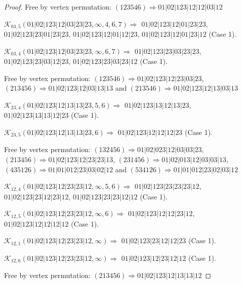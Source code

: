 \documentclass[12pt]{article}
\theoremstyle{plain}
\theoremstyle{definition}
\theoremstyle{remark}
\newcommand{\fancy}[1]{\mathcal{#1}}
\def\K{\fancy{K}}
\begin{document}
\begin{proof}
	
	
	Free by vertex permutation: $(1 2 3 5 4 6)\Rightarrow 01|02|123|12|12|03|12$
	
	
	
	\bigskip
	
	$\K_{03,5}(01|02|123|12|03|23|23,\infty,4, 6, 7)\Rightarrow $ $01|02|123|12|01|23|23$, $01|02|123|23|01|23|23$, $01|02|123|12|01|12|23$, $01|02|123|12|01|23|12$ (Case 1).
	
	$\K_{03,4}(01|02|123|12|03|23|23,\infty,6, 7)\Rightarrow $ $01|02|123|23|03|23|23$, $01|02|123|23|03|12|23$, $01|02|123|23|03|23|12$ (Case 1).
	
	
	
	Free by vertex permutation: $(1 2 3 5 4 6)\Rightarrow 01|02|123|12|23|03|23$, $(2 1 3 4 5 6)\Rightarrow 01|02|123|12|03|13|13$ and $(2 1 3 5 4 6)\Rightarrow 01|02|123|12|13|03|13$
	
	
	
	\bigskip
	
	$\K_{23,4}(01|02|123|12|13|13|23,5, 6)\Rightarrow $ $01|02|123|13|12|13|23$, $01|02|123|13|13|12|23$ (Case 1).
	
	$\K_{23,5}(01|02|123|12|13|13|23,6)\Rightarrow $ $01|02|123|12|12|12|23$ (Case 1).
	
	
	
	Free by vertex permutation: $(1 3 2 4 5 6)\Rightarrow 01|02|023|12|03|03|23$, $(2 1 3 4 5 6)\Rightarrow 01|02|123|12|23|23|13$, $(2 3 1 4 5 6)\Rightarrow 01|02|013|12|03|03|13$, $(4 3 5 1 2 6)\Rightarrow 01|01|012|23|03|02|12$ and $(5 3 4 1 2 6)\Rightarrow 01|01|012|23|02|03|12$
	
	
	
	\bigskip
	
	$\K_{12,4}(01|02|123|12|23|23|12,\infty,5, 6)\Rightarrow $ $01|02|123|23|23|23|12$, $01|02|123|23|12|23|12$, $01|02|123|23|23|12|12$ (Case 1).
	
	$\K_{12,5}(01|02|123|12|23|23|12,\infty,6)\Rightarrow $ $01|02|123|12|12|23|12$, $01|02|123|12|12|12|12$ (Case 1).
	
	$\K_{12,1}(01|02|123|12|23|23|12,\infty)\Rightarrow $ $01|02|123|23|12|12|23$ (Case 1).
	
	$\K_{12,6}(01|02|123|12|23|23|12,\infty)\Rightarrow $ $01|02|123|12|23|12|12$ (Case 1).
	
	
	
	Free by vertex permutation: $(2 1 3 4 5 6)\Rightarrow 01|02|123|12|13|13|12$
	
	
	
	\bigskip
	

\end{proof}
\end{document}
